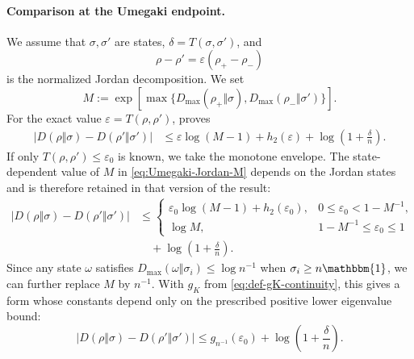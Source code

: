 \documentclass[11pt]{article}
\theoremstyle{remark}
\newcommand{\1}{\mathbbm{1}}
\begin{document}
\paragraph{Comparison at the Umegaki endpoint.}
We assume that $\sigma,\sigma'$ are states,
$\delta=T(\sigma,\sigma')$, and
\begin{equation}
 \rho-\rho'=\varepsilon(\rho_+-\rho_-)
 \label{eq:Umegaki-normalized-Jordan}
\end{equation}
is the normalized Jordan decomposition.  We set
\begin{equation}
 M:=\exp\!\left[
 \max\{D_{\max}(\rho_+\Vert\sigma),
       D_{\max}(\rho_-\Vert\sigma')\}\right].
 \label{eq:Umegaki-Jordan-M}
\end{equation}
For the exact value $\varepsilon=T(\rho,\rho')$,
\cite[Corollary~1, Eq.~(69)]{audenaert2025fundamental} proves
\begin{equation}
 \begin{aligned}
 |D(\rho\Vert\sigma)-D(\rho'\Vert\sigma')|
 &\leq\varepsilon\log(M-1)+h_2(\varepsilon)+\log\left(1+\frac{\delta}{n}\right).
 \end{aligned}
 \label{eq:recent-two-input-Umegaki}
\end{equation}
If only $T(\rho,\rho')\leq\varepsilon_0$ is known, we take the monotone
envelope.  The state-dependent value of $M$ in
\eqref{eq:Umegaki-Jordan-M} depends on the Jordan states and is
therefore retained in that version of the result:
\begin{equation}
 \begin{aligned}
 |D(\rho\Vert\sigma)-D(\rho'\Vert\sigma')|
 &\leq
 \begin{cases}
  \varepsilon_0\log(M-1)+h_2(\varepsilon_0),
  &0\leq\varepsilon_0<1-M^{-1},\\
  \log M,&1-M^{-1}\leq\varepsilon_0\leq1
 \end{cases}\\
 &\quad+\log\left(1+\frac{\delta}{n}\right).
 \end{aligned}
 \label{eq:recent-two-input-Umegaki-envelope}
\end{equation}
Since any state $\omega$ satisfies
$D_{\max}(\omega\Vert\sigma_i)\leq\log n^{-1}$ when
$\sigma_i\geq n\1$, we can further replace $M$ by $n^{-1}$.
With $g_K$ from \eqref{eq:def-gK-continuity}, this gives a form whose
constants depend only on the prescribed positive lower eigenvalue
bound:
\begin{equation}
 |D(\rho\Vert\sigma)-D(\rho'\Vert\sigma')|
 \leq g_{n^{-1}}(\varepsilon_0)
 +\log\left(1+\frac{\delta}{n}\right).
 \label{eq:recent-two-input-Umegaki-slab}
\end{equation}
\end{document}
